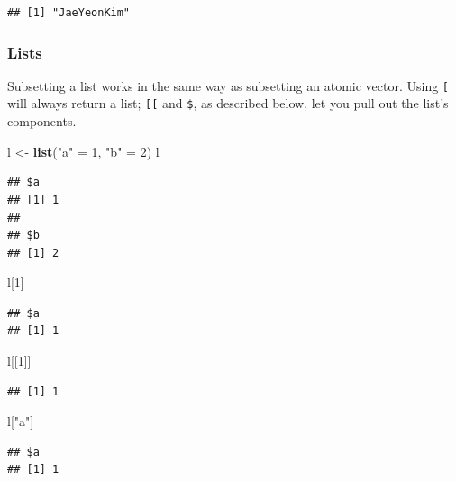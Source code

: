 \documentclass[
]{book}
\newenvironment{Shaded}{\begin{snugshade}}{\end{snugshade}}
\newcommand{\DecValTok}[1]{\textcolor[rgb]{0.00,0.00,0.81}{#1}}
\newcommand{\FunctionTok}[1]{\textcolor[rgb]{0.13,0.29,0.53}{\textbf{#1}}}
\newcommand{\NormalTok}[1]{#1}
\newcommand{\OtherTok}[1]{\textcolor[rgb]{0.56,0.35,0.01}{#1}}
\newcommand{\StringTok}[1]{\textcolor[rgb]{0.31,0.60,0.02}{#1}}
\begin{document}
\begin{verbatim}
## [1] "JaeYeonKim"
\end{verbatim}

\subsubsection{Lists}\label{lists-1}

Subsetting a list works in the same way as subsetting an atomic vector. Using \texttt{{[}} will always return a list; \texttt{{[}{[}} and \texttt{\$}, as described below, let you pull out the list's components.

\begin{Shaded}
\begin{Highlighting}[]
\NormalTok{l }\OtherTok{\textless{}{-}} \FunctionTok{list}\NormalTok{(}\StringTok{"a"} \OtherTok{=} \DecValTok{1}\NormalTok{, }\StringTok{"b"} \OtherTok{=} \DecValTok{2}\NormalTok{)}
\NormalTok{l}
\end{Highlighting}
\end{Shaded}

\begin{verbatim}
## $a
## [1] 1
## 
## $b
## [1] 2
\end{verbatim}

\begin{Shaded}
\begin{Highlighting}[]
\NormalTok{l[}\DecValTok{1}\NormalTok{]}
\end{Highlighting}
\end{Shaded}

\begin{verbatim}
## $a
## [1] 1
\end{verbatim}

\begin{Shaded}
\begin{Highlighting}[]
\NormalTok{l[[}\DecValTok{1}\NormalTok{]]}
\end{Highlighting}
\end{Shaded}

\begin{verbatim}
## [1] 1
\end{verbatim}

\begin{Shaded}
\begin{Highlighting}[]
\NormalTok{l[}\StringTok{"a"}\NormalTok{]}
\end{Highlighting}
\end{Shaded}

\begin{verbatim}
## $a
## [1] 1
\end{verbatim}
\end{document}
